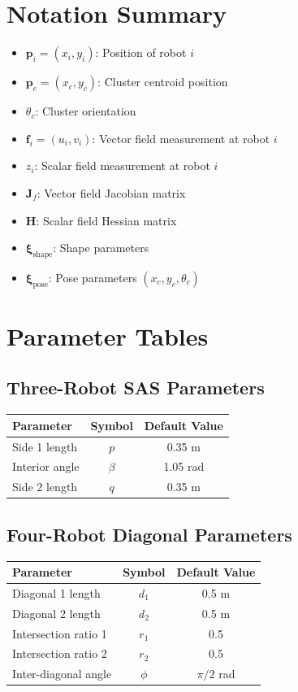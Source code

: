 \documentclass{article}
\begin{document}
\appendix

\section{Notation Summary}

\begin{itemize}
\item $\mathbf{p}_i = (x_i, y_i)$: Position of robot $i$
\item $\mathbf{p}_c = (x_c, y_c)$: Cluster centroid position
\item $\theta_c$: Cluster orientation
\item $\mathbf{f}_i = (u_i, v_i)$: Vector field measurement at robot $i$
\item $z_i$: Scalar field measurement at robot $i$
\item $\mathbf{J}_f$: Vector field Jacobian matrix
\item $\mathbf{H}$: Scalar field Hessian matrix
\item $\boldsymbol{\xi}_{\text{shape}}$: Shape parameters
\item $\boldsymbol{\xi}_{\text{pose}}$: Pose parameters $(x_c, y_c, \theta_c)$
\end{itemize}

\section{Parameter Tables}

\subsection{Three-Robot SAS Parameters}
\begin{center}
\begin{tabular}{|l|c|c|}
\hline
Parameter & Symbol & Default Value \\
\hline
Side 1 length & $p$ & 0.35 m \\
Interior angle & $\beta$ & 1.05 rad \\
Side 2 length & $q$ & 0.35 m \\
\hline
\end{tabular}
\end{center}

\subsection{Four-Robot Diagonal Parameters}
\begin{center}
\begin{tabular}{|l|c|c|}
\hline
Parameter & Symbol & Default Value \\
\hline
Diagonal 1 length & $d_1$ & 0.5 m \\
Diagonal 2 length & $d_2$ & 0.5 m \\
Intersection ratio 1 & $r_1$ & 0.5 \\
Intersection ratio 2 & $r_2$ & 0.5 \\
Inter-diagonal angle & $\phi$ & $\pi/2$ rad \\
\hline
\end{tabular}
\end{center}
\end{document}
